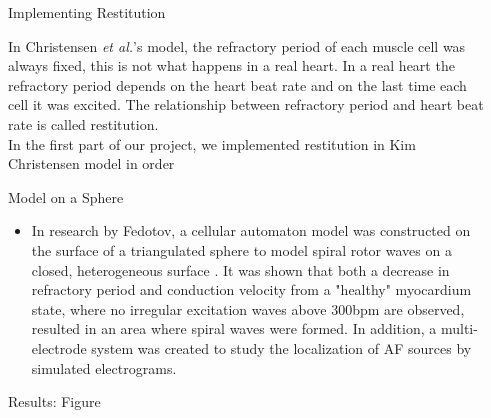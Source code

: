 \documentclass[final,hyperref={pdfpagelabels=false}]{beamer}
\begin{document}
\begin{frame}[t]
\begin{columns}[t]
\begin{column}{.03\textwidth}\end{column} %
 
\begin{column}{.465\textwidth} %




\begin{block}{Implementing Restitution }

In Christensen \emph{et al.}'s model, the refractory period of each muscle cell was always fixed, this is not what happens in a real heart.
In a real heart the refractory period depends on the heart beat rate and on the last time each cell it was excited. The relationship between refractory period and heart beat rate is called restitution.
\\
In the first part of our project, we implemented restitution in Kim Christensen model in order

\end{block}



\begin{block}{Model on a Sphere}


\begin{itemize}
\item In research by Fedotov, a cellular automaton model was constructed on the surface of a triangulated sphere to model spiral rotor waves on a closed, heterogeneous surface \cite{Fedotov}. It was shown that both a decrease in refractory period and conduction velocity from a "healthy" myocardium state, where no irregular excitation waves above 300bpm are observed, resulted in an area where spiral waves were formed. In addition, a multi-electrode system was created to study the localization of AF sources by simulated electrograms. 
\end{itemize}

\end{block}

\begin{block}{Results: Figure}


\end{block}
\end{column}
\end{columns}
\end{frame}
\end{document}
